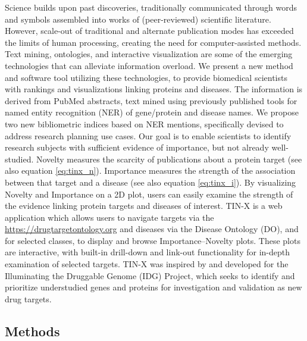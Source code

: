 Science builds upon past discoveries, traditionally communicated through words and symbols assembled into works of (peer-reviewed) scientific literature. However, scale-out of traditional and alternate publication modes has exceeded the limits of human processing, creating the need for computer-assisted methods\cite{Hunter2006-om}. Text mining, ontologies, and interactive visualization are some of the emerging technologies that can alleviate information overload. We present a new method and software tool utilizing these technologies, to provide biomedical scientists with rankings and visualizations linking proteins and diseases.  The information is derived from PubMed abstracts, text mined using previously published tools for named entity recognition (NER) of gene/protein and disease names\cite{Pletscher-Frankild2015-oo,Szklarczyk2015-bl}. We propose two new bibliometric indices based on NER mentions, specifically devised to address research planning use cases. Our goal is to enable scientists to identify research subjects with sufficient evidence of importance, but not already well-studied. Novelty measures the scarcity of publications about a protein target (see also equation \ref{eq:tinx_n}). Importance measures the strength of the association between that target and a disease (see also equation \ref{eq:tinx_i}). By visualizing Novelty and Importance on a 2D plot, users can easily examine the strength of the evidence linking protein targets and diseases of interest. TIN-X is a web application which allows users to navigate targets via the \href{Drug Target Ontology (DTO)}{https://drugtargetontology.org} and diseases via the Disease Ontology (DO)\cite{Kibbe2015-li}, and for selected classes, to display and browse Importance–Novelty plots. These plots are interactive, with built-in drill-down and link-out functionality for in-depth examination of selected targets. TIN-X was inspired by and developed for the Illuminating the Druggable Genome (IDG) Project\cite{Oprea2018-cp}, which seeks to identify and prioritize understudied genes and proteins for investigation and validation as new drug targets.

\subsection{Methods}

